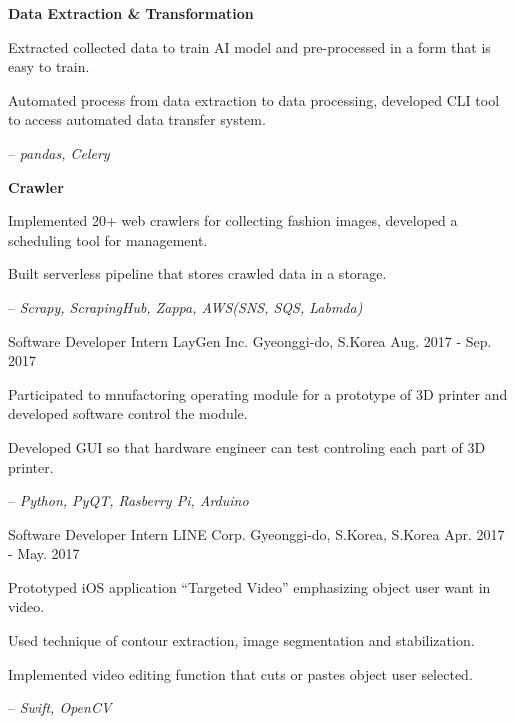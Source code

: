 \begin{cventries}
{\begin{cvitems}
\begin{itemize}
        \end{itemize}
        \item[] {\textbf{Data Extraction \& Transformation}}
        \item {Extracted collected data to train AI model and pre-processed in a form that is easy to train.}
        \item {Automated process from data extraction to data processing, developed CLI tool to access automated data transfer system.}
        \item[--] \textit{pandas, Celery}
        \item[] {\textbf{Crawler}}
        \item {Implemented 20+ web crawlers for collecting fashion images, developed a scheduling tool for management.} 
        \item {Built serverless pipeline that stores crawled data in a storage.}
        \item[--] \textit{Scrapy, ScrapingHub, Zappa, AWS(SNS, SQS, Labmda)}
      \end{cvitems}
    }

  \cventry
    {Software Developer Intern} %
    {LayGen Inc.} %
    {Gyeonggi-do, S.Korea} %
    {Aug. 2017 - Sep. 2017} %
    {
      \begin{cvitems} %
        \item {Participated to mnufactoring operating module for a prototype of 3D printer and developed software control the module.}
        \item {Developed GUI so that hardware engineer can test controling each part of 3D printer.}
        \item[--] \textit{Python, PyQT, Rasberry Pi, Arduino}
      \end{cvitems}
    }

  \cventry
    {Software Developer Intern} %
    {LINE Corp.} %
    {Gyeonggi-do, S.Korea, S.Korea} %
    {Apr. 2017 - May. 2017} %
    {
      \begin{cvitems} %
        \item {Prototyped iOS application ``Targeted Video'' emphasizing object user want in video.}
        \item {Used technique of contour extraction, image segmentation and stabilization.}
        \item {Implemented video editing function that cuts or pastes object user selected.}
        \item[--] \textit{Swift, OpenCV}
      \end{cvitems}
    }


\end{cventries}
